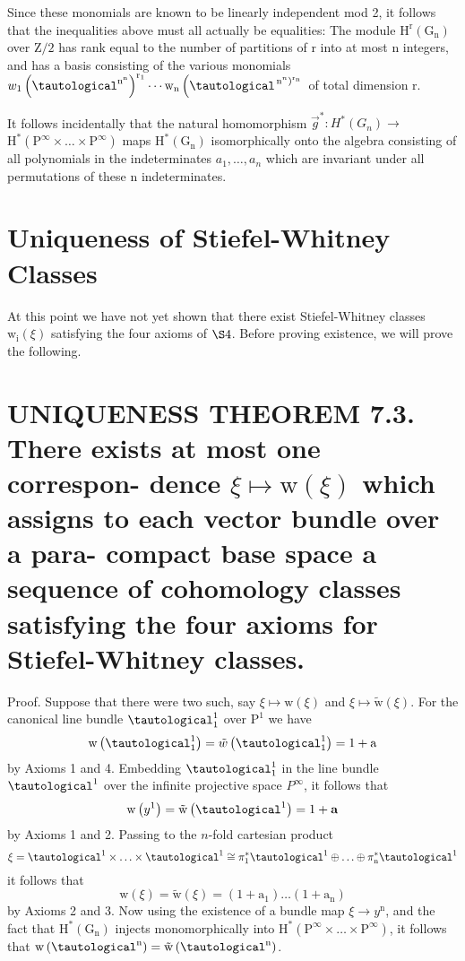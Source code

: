\documentclass[10pt]{article}
\begin{document}
Since these monomials are known to be linearly independent mod 2, it follows that the inequalities above must all actually be equalities: The module $\mathrm{H}^{\mathrm{r}}\left(\mathrm{G}_{\mathrm{n}}\right)$ over $\mathrm{Z} / 2$ has rank equal to the number of partitions of $\mathrm{r}$ into at most $\mathrm{n}$ integers, and has a basis consisting of the various monomials $w_{1}\left(\tautological^{\mathrm{n}^{\mathrm{n}}}\right)^{\mathrm{r}_{1}} \cdots \mathrm{w}_{\mathrm{n}}\left(\tautological^{\left.\mathrm{n}^{n}\right)^{\mathrm{r}_{\mathrm{n}}}}\right.$ of total dimension $\mathrm{r}$.

It follows incidentally that the natural homomorphism $\vec{g}^{*}: H^{*}\left(G_{n}\right) \rightarrow$ $\mathrm{H}^{*}\left(\mathrm{P}^{\infty} \times \ldots \times \mathrm{P}^{\infty}\right)$ maps $\mathrm{H}^{*}\left(\mathrm{G}_{\mathrm{n}}\right)$ isomorphically onto the algebra consisting of all polynomials in the indeterminates $a_{1}, \ldots, a_{n}$ which are invariant under all permutations of these $\mathrm{n}$ indeterminates.

\section{Uniqueness of Stiefel-Whitney Classes}
At this point we have not yet shown that there exist Stiefel-Whitney classes $\mathrm{w}_{\mathrm{i}}(\xi)$ satisfying the four axioms of $\S 4$. Before proving existence, we will prove the following.

\section{UNIQUENESS THEOREM 7.3. There exists at most one correspon- dence $\xi \mapsto \mathrm{w}(\xi)$ which assigns to each vector bundle over a para- compact base space a sequence of cohomology classes satisfying the four axioms for Stiefel-Whitney classes.}
Proof. Suppose that there were two such, say $\xi \mapsto \mathrm{w}(\xi)$ and $\xi \mapsto \tilde{\mathrm{w}}(\xi)$. For the canonical line bundle $\tautological_{1}^{1}$ over $\mathrm{P}^{1}$ we have
$$
\mathrm{w}\left(\tautological_{1}^{1}\right)=\tilde{w}\left(\tautological_{1}^{1}\right)=1+\mathrm{a}
$$
by Axioms 1 and 4. Embedding $\tautological_{1}^{1}$ in the line bundle $\tautological^{1}$ over the infinite projective space $P^{\infty}$, it follows that
$$
\mathrm{w}\left(y^{1}\right)=\tilde{\mathrm{w}}\left(\tautological^{1}\right)=1+\mathbf{a}
$$
by Axioms 1 and 2. Passing to the $n$-fold cartesian product
$$
\xi=\tautological^{1} \times \ldots \times \tautological^{1} \cong \pi_{1}^{*} \tautological^{1} \oplus \ldots \oplus \pi_{\mathrm{n}}^{*} \tautological^{1}
$$
it follows that
$$
\mathrm{w}(\xi)=\tilde{\mathrm{w}}(\xi)=\left(1+\mathrm{a}_{1}\right) \ldots\left(1+\mathrm{a}_{\mathrm{n}}\right)
$$
by Axioms 2 and 3. Now using the existence of a bundle map $\xi \rightarrow y^{\mathrm{n}}$, and the fact that $\mathrm{H}^{*}\left(\mathrm{G}_{\mathrm{n}}\right)$ injects monomorphically into $\mathrm{H}^{*}\left(\mathrm{P}^{\infty} \times \ldots \times \mathrm{P}^{\infty}\right)$, it follows that $\mathrm{w}\left(\tautological^{\mathrm{n}}\right)=\tilde{\mathrm{w}}\left(\tautological^{\mathrm{n}}\right)$.
\end{document}
